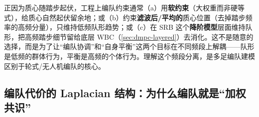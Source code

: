 \begin{insight}\label{ins:dmpc-freq-sep-form}
正因为质心随踏步起伏，工程上编队约束通常（a）用\textbf{软约束}（大权重而非硬等式），给质心自然起伏留余地；或（b）约束\textbf{滤波后/平均的}质心位置（去掉踏步频率的高频分量），只维持低频队形趋势；或（c）在 SRB 这个\textbf{降阶模型}层面维持队形，把高频踏步细节留给底层 WBC（\cref{sec:dmpc-layered}）去消化。这不是随意的选择，而是为了让“编队协调”和“自身平衡”这两个目标在不同频段上解耦——队形是低频的群体行为，平衡是高频的个体行为。理解这个频段分离，是多足编队建模区别于轮式/无人机编队的核心。
\end{insight}

\subsection{编队代价的 Laplacian 结构：为什么编队就是“加权共识”}
\label{sec:dmpc-laplacian}

